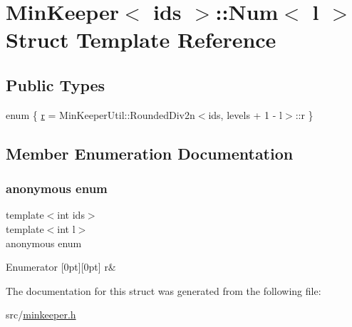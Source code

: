 \hypertarget{structMinKeeper_1_1Num}{}\section{Min\+Keeper$<$ ids $>$\+:\+:Num$<$ l $>$ Struct Template Reference}
\label{structMinKeeper_1_1Num}
\subsection*{Public Types}
\begin{DoxyCompactItemize}
\item 
enum \{ \hyperlink{structMinKeeper_1_1Num_aa17330c307108c34ace840974c85e724aee045d9ab47b61ac5537035973fe9cea}{r} = Min\+Keeper\+Util\+:\+:Rounded\+Div2n$<$ids, levels + 1 -\/ l$>$\+:\+:r
 \}
\end{DoxyCompactItemize}


\subsection{Member Enumeration Documentation}
\mbox{\label{structMinKeeper_1_1Num_aa17330c307108c34ace840974c85e724}} 
\subsubsection{\texorpdfstring{anonymous enum}{anonymous enum}}
{\footnotesize\ttfamily template$<$int ids$>$ \\
template$<$int l$>$ \\
anonymous enum}

\begin{DoxyEnumFields}{Enumerator}
[0pt][0pt]{}\mbox{\label{structMinKeeper_1_1Num_aa17330c307108c34ace840974c85e724aee045d9ab47b61ac5537035973fe9cea}} 
r&\\
\hline

\end{DoxyEnumFields}


The documentation for this struct was generated from the following file\+:\begin{DoxyCompactItemize}
\item 
src/\hyperlink{minkeeper_8h}{minkeeper.\+h}\end{DoxyCompactItemize}
